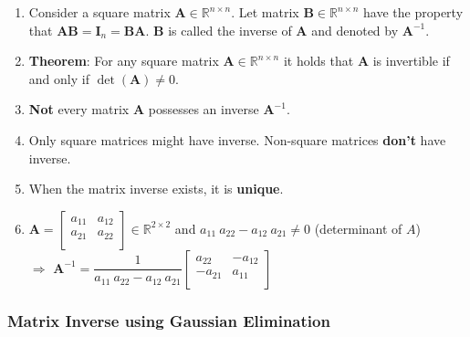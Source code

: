 \begin{enumerate}
    \item Consider a square matrix $\bm{A} \in \mathbb{R}^{n\times n}$. 
    Let matrix $\bm{B} \in \mathbb{R}^{n\times n}$ have the property that $\bm{A}\bm{B} = \bm{I}_n = \bm{B}\bm{A}$. 
    $\bm{B}$ is called the inverse of $\bm{A}$ and denoted by $\bm{A}^{-1}$.
    \hfill \cite{mfml/book/mml/Deisenroth-Faisal-Ong}

    \item \textbf{Theorem}: For any square matrix $\bm{A} \in \mathbb{R}^{n\times n}$ it holds that $\bm{A}$ is invertible if and only if $\det(\bm{A})\neq 0$.
    \hfill \cite{mfml/book/mml/Deisenroth-Faisal-Ong}

    \item \textbf{Not} every matrix $\bm{A}$ possesses an inverse $\bm{A}^{-1}$.
    \hfill \cite{mfml/book/mml/Deisenroth-Faisal-Ong}

    \item Only square matrices might have inverse. Non-square matrices \textbf{don't} have inverse.

    \item When the matrix inverse exists, it is \textbf{unique}.
    \hfill \cite{mfml/book/mml/Deisenroth-Faisal-Ong}

    \item $
        \bm{A} = \begin{bmatrix}
            a_{11} & a_{12} \\
            a_{21} & a_{22} \\
        \end{bmatrix} 
        \in \mathbb{R}^{2\times 2}
    $
    \hspace{1cm} and \hspace{1cm}
    $a_{11}\ a_{22} - a_{12}\ a_{21} \neq 0$ (determinant of $A$)\\[0.4cm] 
    $\Rightarrow$
    $
        \bm{A}^{-1} = 
        \dfrac{1}{a_{11}\ a_{22} - a_{12}\ a_{21}}
        \begin{bmatrix}
            a_{22} & -a_{12} \\
            -a_{21} & a_{11} \\
        \end{bmatrix}
    $
    \hfill \cite{mfml/book/mml/Deisenroth-Faisal-Ong}

\end{enumerate}



\subsubsection{Matrix Inverse using Gaussian Elimination}

